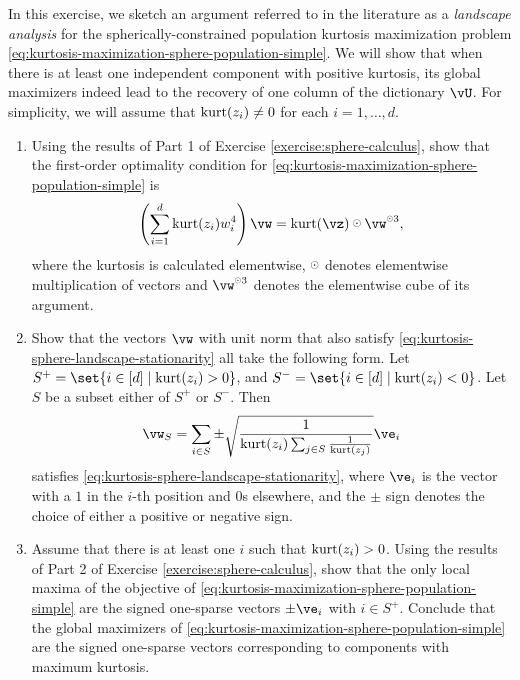 \documentclass[../../book-main.tex]{subfiles}
\begin{document}
\begin{exercise}\label{exercise:kurtosis-sphere-landscape}
    In this exercise, we sketch an argument referred to in the literature as a \textit{landscape analysis} for the spherically-constrained population kurtosis maximization problem \eqref{eq:kurtosis-maximization-sphere-population-simple}. We will show that when there is at least one independent component with positive kurtosis, its 
    global maximizers indeed lead to the recovery of one column of the dictionary $\vU$.
    For simplicity, we will assume that $\mathop{\mathrm{kurt}}(z_i) \neq 0$ for each $i = 1, \dots, d$.
    \begin{enumerate}
        \item Using the results of Part 1 of Exercise \ref{exercise:sphere-calculus}, 
        show that the first-order optimality condition for \eqref{eq:kurtosis-maximization-sphere-population-simple} is
        \begin{equation}\label{eq:kurtosis-sphere-landscape-stationarity}
            \left(\sum_{i=1}^d \kurt(z_i) w_i^4 \right) 
            \vw = \kurt(\vz) \hada \vw^{\hada 3}, 
        \end{equation}
        where the kurtosis is calculated elementwise, $\hada$ denotes elementwise multiplication of vectors and $\vw^{\hada 3}$ denotes the elementwise cube of its argument.
        \item Show that the vectors $\vw$ with unit norm that also satisfy \eqref{eq:kurtosis-sphere-landscape-stationarity}
        all take the following form.
        Let $S^+ = \set{i \in [d] \given \kurt(z_i) > 0}$, and 
        $S^- = \set{i \in [d] \given \kurt(z_i) < 0}$.
        Let $S$ be a subset either of $S^+$ or $S^-$.
        Then 
        \begin{equation}\label{eq:kurtosis-sphere-landscape-cps}
            \vw_S = \sum_{i \in S} \pm \sqrt{\frac{1}{\kurt(z_i) \sum_{j \in S} \frac{1}{\kurt(z_j)}}} \ve_i
        \end{equation}
        satisfies \eqref{eq:kurtosis-sphere-landscape-stationarity},
        where $\ve_i$ is the vector with a $1$ in the $i$-th position and $0$s elsewhere, and the $\pm$ sign denotes the choice of either a positive or negative sign.
        \item Assume that there is at least one $i$ such that $\mathop{\mathrm{kurt}}(z_i) > 0$. Using the results of Part 2 of Exercise \ref{exercise:sphere-calculus}, show that the only local maxima of the objective of \eqref{eq:kurtosis-maximization-sphere-population-simple} are the signed one-sparse vectors $\pm \ve_i$ with $i \in S^+$. Conclude that the global maximizers of \eqref{eq:kurtosis-maximization-sphere-population-simple} are the signed one-sparse vectors corresponding to components with maximum kurtosis. %

\end{enumerate}
\end{exercise}
\end{document}
